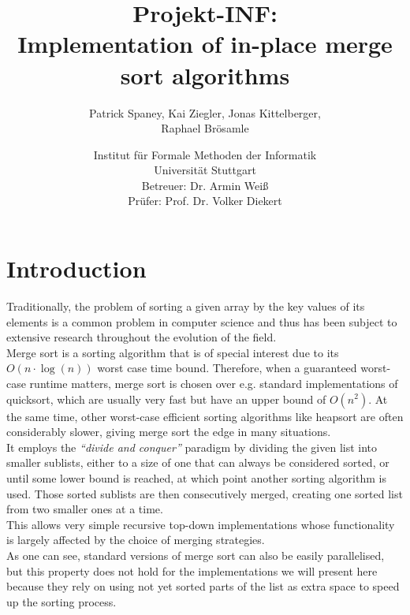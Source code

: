 \documentclass[11pt,pdftex,a4paper, twocolumn]{article}
\begin{document}
\title{Projekt-INF:\\
Implementation of in-place merge sort algorithms}
\author{Patrick Spaney, Kai Ziegler, Jonas Kittelberger, \\ Raphael Brösamle}
\date{Institut für Formale Methoden der Informatik \\ Universität Stuttgart\\
\normalsize Betreuer: Dr. Armin Weiß\\
Prüfer: Prof. Dr. Volker Diekert}
\maketitle
\section*{Introduction}
Traditionally, the problem of sorting a given array by the key values of its elements is a common problem in computer science and thus has been subject to extensive research throughout the evolution of the field. \\
Merge sort is a sorting algorithm that is of special interest due to its $O(n \cdot \log(n))$ worst case time bound. Therefore, when a guaranteed worst-case runtime matters, merge sort is chosen over e.g. standard implementations of quicksort, which are usually very fast but have an upper bound of $O(n^{2})$. At the same time, other worst-case efficient sorting algorithms like heapsort are often considerably slower, giving merge sort the edge in many situations. \\
It employs the \textit{“divide and conquer”} paradigm by dividing the given list into smaller sublists, either to a size of one that can always be considered sorted, or until some lower bound is reached, at which point another sorting algorithm is used. Those sorted sublists are then consecutively merged, creating one sorted list from two smaller ones at a time. \\
This allows very simple recursive top-down implementations whose functionality is largely affected by the choice of merging strategies. \\
As one can see, standard versions of merge sort can also be easily parallelised, but this property does not hold for the implementations we will present here because they rely on using not yet sorted parts of the list as extra space to speed up the sorting process. \\
\end{document}
